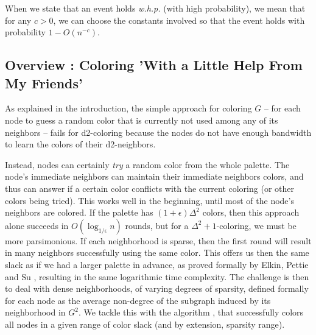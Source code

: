 When we state that an event holds \emph{w.h.p.} (with high probability), we mean that for any $c > 0$, we can choose the constants involved so that the event holds with probability $1 -O(n^{-c})$. 

\subsection{Overview : Coloring 'With a Little Help From My Friends'}

As explained in the introduction, the simple approach for coloring $G$ -- for each node to guess a random color that is currently not used among any of its neighbors -- fails for d2-coloring because the nodes do not have enough bandwidth to learn the colors of their d2-neighbors. 

Instead, nodes can certainly \emph{try} a random color from the whole palette. The node's immediate neighbors can maintain their immediate neighbors colors, and thus can answer if a certain color conflicts with the current coloring (or other colors being tried).
This works well in the beginning, until most of the node's neighbors are colored.
If the palette has $(1+\epsilon)\Delta^2$ colors, then this approach alone succeeds in $O(\log_{1/\epsilon} n)$ rounds, but for a $\Delta^2+1$-coloring, we must be more parsimonious. 
If each neighborhood is sparse, then the first round will result in many neighbors successfully using the same color. 
This offers us then the same slack as if we had a larger palette in advance, as proved formally by Elkin, Pettie and Su \cite{EPS15}, resulting in the same logarithmic time complexity.
The challenge is then to deal with dense neighborhoods, of varying degrees of sparsity, defined formally for each node as the average non-degree of the subgraph induced by its neighborhood in $G^2$.
We tackle this with the algorithm , that successfully colors all nodes in a given range of color slack (and by extension, sparsity range).


